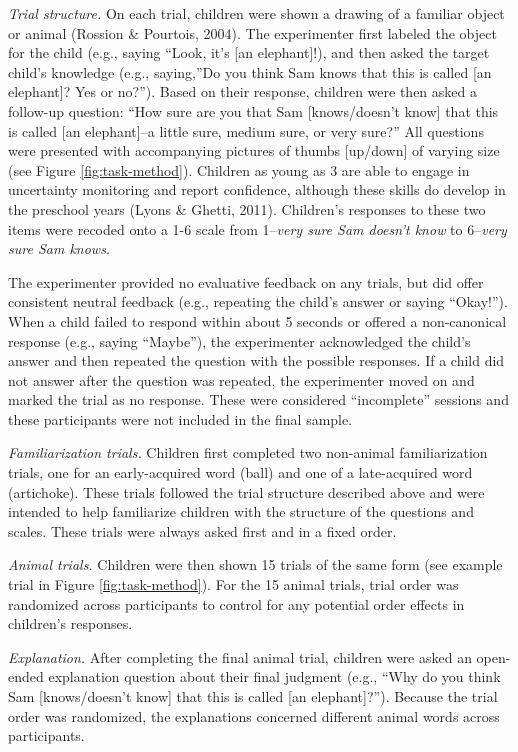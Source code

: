 \documentclass[10pt, letterpaper]{article}
\begin{document}
\emph{Trial structure.} On each trial, children were shown a drawing of
a familiar object or animal (Rossion \& Pourtois, 2004). The
experimenter first labeled the object for the child (e.g., saying
``Look, it's {[}an elephant{]}!), and then asked the target child's
knowledge (e.g., saying,''Do you think Sam knows that this is called
{[}an elephant{]}? Yes or no?''). Based on their response, children were
then asked a follow-up question: ``How sure are you that Sam
{[}knows/doesn't know{]} that this is called {[}an elephant{]}--a little
sure, medium sure, or very sure?'' All questions were presented with
accompanying pictures of thumbs {[}up/down{]} of varying size (see
Figure \ref{fig:task-method}). Children as young as 3 are able to engage
in uncertainty monitoring and report confidence, although these skills
do develop in the preschool years (Lyons \& Ghetti, 2011). Children's
responses to these two items were recoded onto a 1-6 scale from
1--\emph{very sure Sam doesn't know} to 6--\emph{very sure Sam knows}.

The experimenter provided no evaluative feedback on any trials, but did
offer consistent neutral feedback (e.g., repeating the child's answer or
saying ``Okay!''). When a child failed to respond within about 5 seconds
or offered a non-canonical response (e.g., saying ``Maybe''), the
experimenter acknowledged the child's answer and then repeated the
question with the possible responses. If a child did not answer after
the question was repeated, the experimenter moved on and marked the
trial as no response. These were considered ``incomplete'' sessions and
these participants were not included in the final sample.

\emph{Familiarization trials.} Children first completed two non-animal
familiarization trials, one for an early-acquired word (ball) and one of
a late-acquired word (artichoke). These trials followed the trial
structure described above and were intended to help familiarize children
with the structure of the questions and scales. These trials were always
asked first and in a fixed order.

\emph{Animal trials.} Children were then shown 15 trials of the same
form (see example trial in Figure \ref{fig:task-method}). For the 15
animal trials, trial order was randomized across participants to control
for any potential order effects in children's responses.

\emph{Explanation.} After completing the final animal trial, children
were asked an open-ended explanation question about their final judgment
(e.g., ``Why do you think Sam {[}knows/doesn't know{]} that this is
called {[}an elephant{]}?''). Because the trial order was randomized,
the explanations concerned different animal words across participants.
\end{document}
